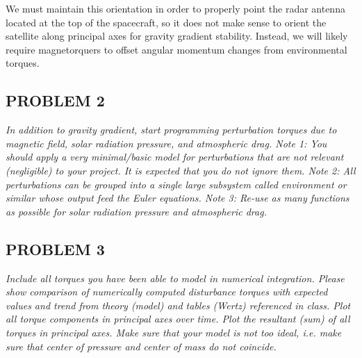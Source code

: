 
We must maintain this orientation in order to properly point the radar antenna located at the top of the spacecraft, so it does not make sense to orient the satellite along principal axes for gravity gradient stability. Instead, we will likely require magnetorquers to offset angular momentum changes from environmental torques.


\subsection{PROBLEM 2}
\textit{In addition to gravity gradient, start programming perturbation torques due to magnetic field, solar radiation pressure, and atmospheric drag. Note 1: You should apply a very minimal/basic model for perturbations that are not relevant (negligible) to your project. It is expected that you do not ignore them. Note 2: All perturbations can be grouped into a single large subsystem called environment or similar whose output feed
the Euler equations. Note 3: Re-use as many functions as possible for solar radiation pressure and atmospheric drag.}


\subsection{PROBLEM 3}
\textit{Include all torques you have been able to model in numerical integration. Please show comparison of numerically computed disturbance torques with expected values and trend from theory (model) and tables (Wertz) referenced in class. Plot all torque components in principal axes over time. Plot the resultant (sum) of all torques in principal axes. Make sure that your model is not too ideal, i.e. make sure that center of pressure and center of mass do not coincide.}

